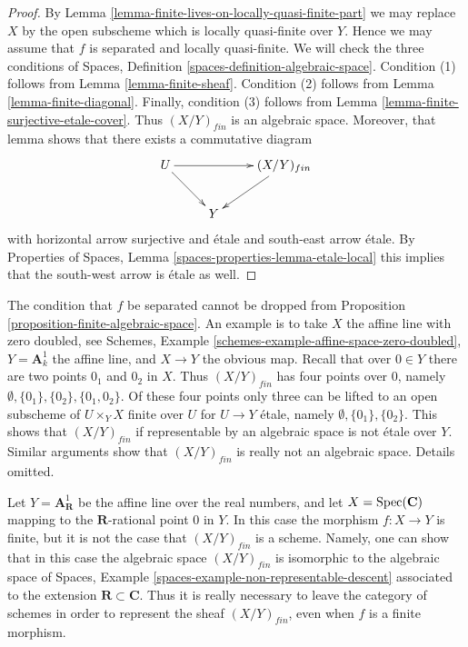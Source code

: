 \begin{proof}
By
Lemma \ref{lemma-finite-lives-on-locally-quasi-finite-part}
we may replace $X$ by the open subscheme which is locally quasi-finite
over $Y$. Hence we may assume that $f$ is separated and locally quasi-finite.
We will check the three conditions of
Spaces, Definition \ref{spaces-definition-algebraic-space}.
Condition (1) follows from
Lemma \ref{lemma-finite-sheaf}.
Condition (2) follows from
Lemma \ref{lemma-finite-diagonal}.
Finally, condition (3) follows from
Lemma \ref{lemma-finite-surjective-etale-cover}.
Thus $(X/Y)_{fin}$ is an algebraic space.
Moreover, that lemma shows that there exists a commutative
diagram
$$
\xymatrix{
U \ar[rr] \ar[rd] & & (X/Y)_{fin} \ar[ld] \\
& Y
}
$$
with horizontal arrow surjective and \'etale and south-east arrow
\'etale. By
Properties of Spaces, Lemma \ref{spaces-properties-lemma-etale-local}
this implies that the south-west arrow is \'etale as well.
\end{proof}

\begin{remark}
\label{remark-warning}
The condition that $f$ be separated cannot be dropped from
Proposition \ref{proposition-finite-algebraic-space}.
An example is to take $X$ the affine line with zero doubled, see
Schemes, Example \ref{schemes-example-affine-space-zero-doubled},
$Y = \mathbf{A}^1_k$ the affine line, and $X \to Y$ the obvious map.
Recall that over $0 \in Y$ there are two points $0_1$ and $0_2$
in $X$. Thus $(X/Y)_{fin}$ has four points over $0$, namely
$\emptyset, \{0_1\}, \{0_2\}, \{0_1, 0_2\}$.
Of these four points only three can be lifted to an open
subscheme of $U \times_Y X$ finite over $U$ for $U \to Y$ \'etale,
namely $\emptyset, \{0_1\}, \{0_2\}$. This shows that $(X/Y)_{fin}$
if representable by an algebraic space is not \'etale over $Y$.
Similar arguments show that $(X/Y)_{fin}$ is really not an algebraic
space. Details omitted.
\end{remark}

\begin{remark}
\label{remark-not-scheme}
Let $Y = \mathbf{A}^1_{\mathbf{R}}$ be the affine line over the real
numbers, and let $X = \mathop{\mathrm{Spec}}(\mathbf{C})$ mapping to the
$\mathbf{R}$-rational point $0$ in $Y$. In this case the morphism
$f : X \to Y$ is finite, but it is not the case that $(X/Y)_{fin}$
is a scheme. Namely, one can show that in this case the algebraic
space $(X/Y)_{fin}$ is isomorphic to the algebraic space of
Spaces, Example \ref{spaces-example-non-representable-descent}
associated to the extension $\mathbf{R} \subset \mathbf{C}$.
Thus it is really necessary to leave the category of schemes
in order to represent the sheaf $(X/Y)_{fin}$, even when $f$
is a finite morphism.
\end{remark}

